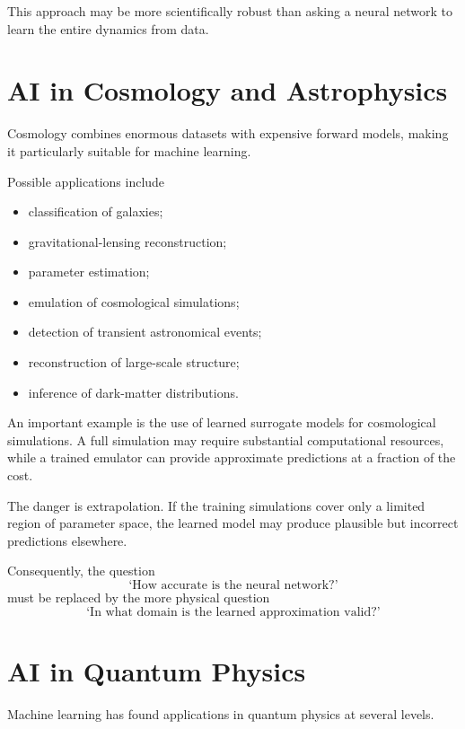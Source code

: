 \documentclass[11pt,a4paper]{article}
\begin{document}
This approach may be more scientifically robust than asking a neural network
to learn the entire dynamics from data.

\section{AI in Cosmology and Astrophysics}

Cosmology combines enormous datasets with expensive forward models, making it
particularly suitable for machine learning.

Possible applications include

\begin{itemize}
\item classification of galaxies;
\item gravitational-lensing reconstruction;
\item parameter estimation;
\item emulation of cosmological simulations;
\item detection of transient astronomical events;
\item reconstruction of large-scale structure;
\item inference of dark-matter distributions.
\end{itemize}

An important example is the use of learned surrogate models for cosmological
simulations. A full simulation may require substantial computational resources,
while a trained emulator can provide approximate predictions at a fraction of
the cost.

The danger is extrapolation. If the training simulations cover only a limited
region of parameter space, the learned model may produce plausible but
incorrect predictions elsewhere.

Consequently, the question
\begin{equation}
\text{`How accurate is the neural network?'}
\end{equation}
must be replaced by the more physical question
\begin{equation}
\text{`In what domain is the learned approximation valid?'}
\end{equation}

\section{AI in Quantum Physics}

Machine learning has found applications in quantum physics at several levels.
\end{document}
